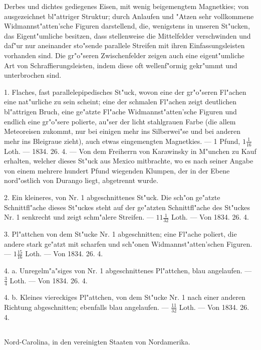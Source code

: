 \documentclass[a4paper, 11pt, oneside, polutonikogreek, german]{article}
\begin{document}
\setlength{\leftskip}{0pt}
\setlength{\parindent}{20pt}

Derbes und dichtes gediegenes Eisen, mit wenig beigemengtem Magnetkies; von ausgezeichnet bl"attriger Struktur; durch Anlaufen und "Atzen sehr vollkommene Widmannst"atten'sche Figuren darstellend, die, wenigstens in unseren St"ucken, das Eigent"umliche besitzen, dass stellenweise die Mittelfelder verschwinden und daf"ur nur aneinander sto"sende parallele Streifen mit ihren Einfassungsleisten vorhanden sind. Die gr"o"seren Zwischenfelder zeigen auch eine eigent"umliche Art von Schraffierungsleisten, indem diese oft wellenf"ormig gekr"ummt und unterbrochen sind.

1. Flaches, fast parallelepipedisches St"uck, wovon eine der gr"o"seren Fl"achen eine nat"urliche zu sein scheint; eine der schmalen Fl"achen zeigt deutlichen bl"attrigen Bruch, eine ge"atzte Fl"ache Widmannst"atten'sche Figuren und endlich eine gr"o"sere polierte, au"ser der licht stahlgrauen Farbe (die allem Meteoreisen zukommt, nur bei einigen mehr ins Silberwei"se und bei anderen mehr ins Bleigraue zieht), auch etwas eingemengten Magnetkies. --- 1 Pfund, $1\frac{1}{16}$ Loth. --- 1834. 26. 4. --- Von dem Freiherrn von Karawinsky in M"unchen zu Kauf erhalten, welcher dieses St"uck aus Mexico mitbrachte, wo es nach seiner Angabe von einem mehrere hundert Pfund wiegenden Klumpen, der in der Ebene nord"ostlich von Durango liegt, abgetrennt wurde.

2. Ein kleineres, von Nr. 1 abgeschnittenes St"uck. Die sch"on ge"atzte Schnittfl"ache dieses St"uckes steht auf der ge"atzten Schnittfl"ache des St"uckes Nr. 1 senkrecht und zeigt schm"alere Streifen. --- $11\frac{1}{32}$ Loth. --- Von 1834. 26. 4.

3. Pl"attchen von dem St"ucke Nr. 1 abgeschnitten; eine Fl"ache poliert, die andere stark ge"atzt mit scharfen und sch"onen Widmannst"atten'schen Figuren. --- $1\frac{15}{16}$ Loth. --- Von 1834. 26. 4.

4. a. Unregelm"a"siges von Nr. 1 abgeschnittenes Pl"attchen, blau angelaufen. --- $\frac{3}{4}$ Loth. --- Von 1834. 26. 4.

4. b. Kleines viereckiges Pl"attchen, von dem St"ucke Nr. 1 nach einer anderen Richtung abgeschnitten; ebenfalls blau angelaufen. --- $\frac{11}{32}$ Loth. --- Von 1834. 26. 4.
\subsection{}
\begin{center}

Nord-Carolina, in den vereinigten Staaten von Nordamerika.
\end{center}
\end{document}

